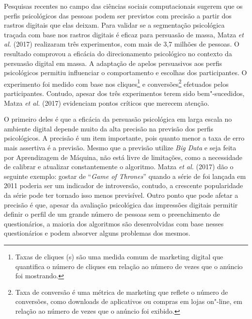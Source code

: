 Pesquisas recentes no campo das ciências sociais computacionais sugerem
que os perfis psicológicos das pessoas podem ser previstos com precisão
a partir dos rastros digitais que elas deixam. Para validar se a
segmentação psicológica traçada com base nos rastros digitais é eficaz
para persuasão de massa, Matza \emph{et al.} (2017) realizaram três
experimentos, com mais de 3,7 milhões de pessoas. O resultado comprovou
a eficácia do direcionamento psicológico no contexto da persuasão
digital em massa. A adaptação de apelos persuasivos aos perfis
psicológicos permitiu influenciar o comportamento e escolhas dos
participantes. O experimento foi medido com base nos cliques\footnote{Taxas
  de cliques (s) são uma medida comum de marketing digital que
  quantifica o número de cliques em relação ao número de vezes que o
  anúncio foi mostrando.} e conversões\footnote{Taxa de conversão é uma
  métrica de marketing que reflete o número de conversões, como
  downloads de aplicativos ou compras em lojas on"-line, em relação ao
  número de vezes que o anúncio foi exibido.} efetuados pelos
participantes. Contudo, apesar dos três experimentos terem sido
bem"-sucedidos, Matza \emph{et al.} (2017) evidenciam pontos críticos que merecem
atenção.

O primeiro deles é que a eficácia da persuasão psicológica em larga
escala no ambiente digital depende muito da alta precisão na previsão
dos perfis psicológicos. A precisão é um item importante, pois quanto
menor a taxa de erro mais assertiva é a previsão. Mesmo que a previsão
utilize \emph{Big Data} e seja feita por Aprendizagem de Máquina, não
está livre de limitações, como a necessidade de calibrar e atualizar
constantemente o algoritmo. Matza \emph{et al.} (2017) dão o seguinte exemplo:
gostar de ``\emph{Game of Thrones}'' quando a série de  foi lançada em
2011 poderia ser um indicador de introversão, contudo, a crescente
popularidade da série pode ter tornado isso menos previsível. Outro
ponto que pode afetar a precisão é que, apesar da avaliação psicológica
das impressões digitais permitir definir o perfil de um grande número de
pessoas sem o preenchimento de questionários, a maioria dos algoritmos
são desenvolvidas com base nesses questionários e podem absorver alguns
problemas dos mesmos.

